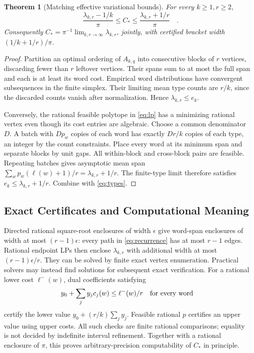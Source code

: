 \documentclass[11pt,letterpaper]{article}
\newtheorem{theorem}{Theorem}
\theoremstyle{definition}\newtheorem{definition}[theorem]{Definition}
\theoremstyle{remark}\newtheorem{remark}[theorem]{Remark}
\newcommand{\CC}{C_\ast}
\begin{document}
\begin{theorem}[Matching effective variational bounds]\label{thm:lp}
For every $k\ge1,r\ge2$,
\begin{equation}\label{eq:effective}
 \boxed{\quad\frac{\lambda_{k,r}-1/k}{\pi}\le\CC
 \le\frac{\lambda_{k,r}+1/r}{\pi}\quad}.
\end{equation}
Consequently $\CC=\pi^{-1}\lim_{k,r\to\infty}\lambda_{k,r}$, jointly,
with certified bracket width $(1/k+1/r)/\pi$.
\end{theorem}
\begin{proof}
Partition an optimal ordering of $A_{k,q}$ into consecutive blocks of
$r$ vertices, discarding fewer than $r$ leftover vertices. Their spans
sum to at most the full span and each is at least its word cost.
Empirical word distributions have convergent subsequences in the finite
simplex. Their limiting mean type counts are $r/k$, since the discarded
counts vanish after normalization. Hence $\lambda_{k,r}\le e_k$.

Conversely, the rational feasible polytope in \eqref{eq:lp} has a minimizing
rational vertex even though its cost entries are algebraic. Choose a
common denominator $D$. A batch with $Dp_w$ copies of each word has
exactly $Dr/k$ copies of each type, an integer by the count constraints.
Place every word at its minimum span and separate blocks by unit gaps.
All within-block and cross-block pairs are feasible. Repeating batches
gives asymptotic mean span
$\sum_w p_w(\ell(w)+1)/r=\lambda_{k,r}+1/r$.
The finite-type limit therefore satisfies
$e_k\le\lambda_{k,r}+1/r$. Combine with \eqref{eq:types}.
\end{proof}

\subsection{Exact Certificates and Computational Meaning}
Directed rational square-root enclosures of width $\epsilon$ give
word-span enclosures of width at most $(r-1)\epsilon$: every path in
\eqref{eq:recurrence} has at most $r-1$ edges. Rational endpoint LPs
then enclose $\lambda_{k,r}$ with additional width at most
$(r-1)\epsilon/r$. They can be solved by finite exact vertex enumeration.
Practical solvers may instead find solutions for subsequent exact verification.
For a rational lower cost $\ell^-(w)$, dual coefficients satisfying
\[
 y_0+\sum_j y_jc_j(w)\le\ell^-(w)/r\quad\hbox{for every word}
\]
certify the lower value $y_0+(r/k)\sum_jy_j$. Feasible rational $p$
certifies an upper value using upper costs. All such checks are finite
rational comparisons; equality is not decided by indefinite interval
refinement. Together with a rational enclosure of $\pi$, this proves
arbitrary-precision computability of $\CC$ in principle.
\end{document}
